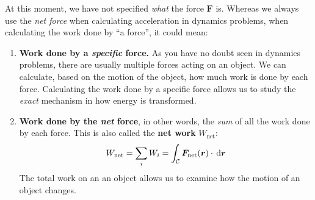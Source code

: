 At this moment, we have not specified \emph{what} the force $\bm F$ is. Whereas
we always use the \emph{net force} when calculating acceleration in dynamics
problems, when calculating the work done by ``a force'', it could mean:
\begin{enumerate}[itemsep=6pt]
\item\textbf{Work done by a \emph{specific} force.} As you have no doubt seen
  in dynamics problems, there are usually multiple forces acting on an object.
  We can calculate, based on the motion of the object, how much work is done by
  each force. Calculating the work done by a specific force allows us to study
  the \emph{exact} mechanism in how energy is transformed.
  
\item\textbf{Work done by the \emph{net} force}, in other words, the \emph{sum}
  of all the work done by each force. This is also called the \textbf{net work}
  $W_\text{net}$:
  \begin{equation*}
    W_\text{net}
    = \sum_i W_i
    =\int_{\mathcal C}\bm F_\text{net}(\bm r)\cdot\dl{\bm r}
  \end{equation*}
  The total work on an an object allows us to examine how the motion of an
  object changes.
\end{enumerate}

